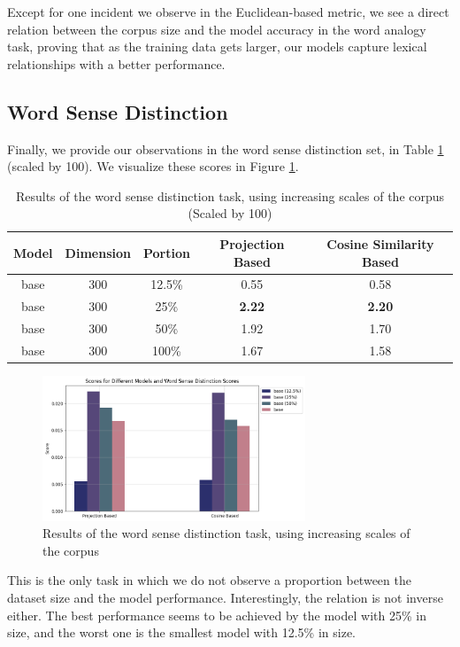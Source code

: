 Except for one incident we observe in the Euclidean-based metric, we see a direct relation between the corpus size and the model accuracy in the word analogy task, proving that as the training data gets larger, our models capture lexical relationships with a better performance.


\subsection{Word Sense Distinction}

Finally, we provide our observations in the word sense distinction set, in Table \ref{tab:sense_scale} (scaled by 100). We visualize these scores in Figure \ref{fig:sense_scale}.

\begin{table}[h]
\centering
\begin{tabular}{|ccc|cc|}
\hline
Model & Dimension & Portion & Projection Based & Cosine Similarity Based \\ \hline
base & 300 & 12.5\% & 0.55 & 0.58 \\
base & 300 & 25\% & \textbf{2.22} & \textbf{2.20} \\
base & 300 & 50\% & 1.92 & 1.70 \\
base & 300 & 100\% & 1.67 & 1.58 \\ \hline
\end{tabular}
\caption{Results of the word sense distinction task, using increasing scales of the corpus (Scaled by 100)}
\label{tab:sense_scale}
\end{table}

\begin{figure}[h]
    \centering
    \includegraphics[width=0.7\textwidth]{img/sense_scale.png}
    \caption{Results of the word sense distinction task, using increasing scales of the corpus}
    \label{fig:sense_scale}
\end{figure}

This is the only task in which we do not observe a proportion between the dataset size and the model performance. Interestingly, the relation is not inverse either. The best performance seems to be achieved by the model with 25\% in size, and the worst one is the smallest model with 12.5\% in size.

